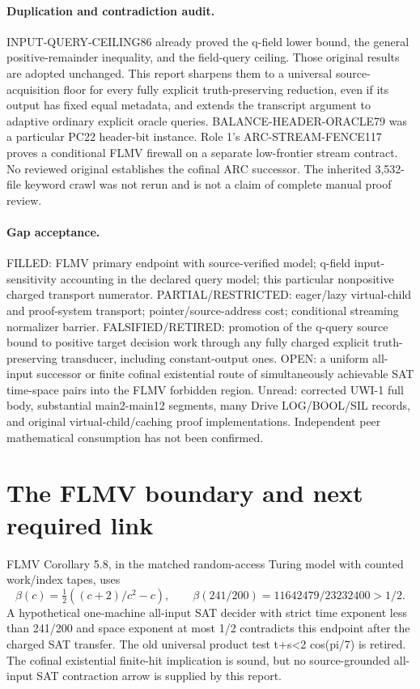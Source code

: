 \documentclass[11pt]{article}
\begin{document}
\paragraph{Duplication and contradiction audit.}
INPUT-QUERY-CEILING86 already proved the q-field lower bound, the general positive-remainder inequality, and the field-query ceiling. Those original results are adopted unchanged. This report sharpens them to a universal source-acquisition floor for every fully explicit truth-preserving reduction, even if its output has fixed equal metadata, and extends the transcript argument to adaptive ordinary explicit oracle queries. BALANCE-HEADER-ORACLE79 was a particular PC22 header-bit instance. Role 1's ARC-STREAM-FENCE117 proves a conditional FLMV firewall on a separate low-frontier stream contract. No reviewed original establishes the cofinal ARC successor. The inherited 3,532-file keyword crawl was not rerun and is not a claim of complete manual proof review.

\paragraph{Gap acceptance.}
FILLED: FLMV primary endpoint with source-verified model; q-field input-sensitivity accounting in the declared query model; this particular nonpositive charged transport numerator. PARTIAL/RESTRICTED: eager/lazy virtual-child and proof-system transport; pointer/source-address cost; conditional streaming normalizer barrier. FALSIFIED/RETIRED: promotion of the q-query source bound to positive target decision work through any fully charged explicit truth-preserving transducer, including constant-output ones. OPEN: a uniform all-input successor or finite cofinal existential route of simultaneously achievable SAT time-space pairs into the FLMV forbidden region. Unread: corrected UWI-1 full body, substantial main2-main12 segments, many Drive LOG/BOOL/SIL records, and original virtual-child/caching proof implementations. Independent peer mathematical consumption has not been confirmed.

\section{The FLMV boundary and next required link}
FLMV Corollary 5.8, in the matched random-access Turing model with counted work/index tapes, uses
\[
\beta(c)=\tfrac12((c+2)/c^2-c),\qquad
\beta(241/200)=11642479/23232400>1/2.
\]
A hypothetical one-machine all-input SAT decider with strict time exponent less than 241/200 and space exponent at most 1/2 contradicts this endpoint after the charged SAT transfer. The old universal product test t+s<2 cos(pi/7) is retired. The cofinal existential finite-hit implication is sound, but no source-grounded all-input SAT contraction arrow is supplied by this report.
\end{document}
